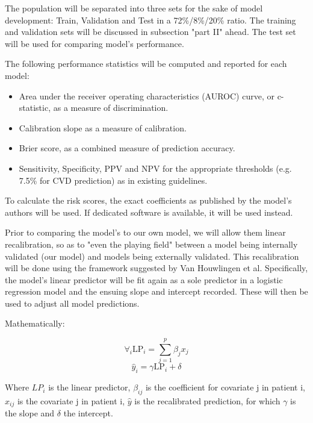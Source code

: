\documentclass[a4paper,12pt]{article}
\begin{document}
		The population will be separated into three sets for the sake of model development: Train, Validation and Test in a 72\%/8\%/20\% ratio. The training and validation sets will be discussed in subsection "part II" ahead. The test set will be used for comparing model's performance.
		
		The following performance statistics will be computed and reported for each model\cite{Steyerberg2008,FrankE.Harrell2015}:
		
		\begin{itemize}
			\item Area under the receiver operating characteristics (AUROC) curve, or c-statistic, as a measure of discrimination.
			\item Calibration slope as a measure of calibration.
			\item Brier score, as a combined measure of prediction accuracy.
			\item Sensitivity, Specificity, PPV and NPV for the appropriate thresholds (e.g. 7.5\% for CVD prediction) as in existing guidelines\cite{Goff2014,Bibbins-Domingo2016}.
		\end{itemize}
		
		To calculate the risk scores, the exact coefficients as published by the model's authors will be used. If dedicated software is available, it will be used instead.
		
		Prior to comparing the model's to our own model, we will allow them linear recalibration, so as to "even the playing field" between a model being internally validated (our model) and models being externally validated. This recalibration will be done using the framework suggested by Van Houwlingen et al\cite{Houwelingen2000}. Specifically, the model's linear predictor will be fit again as a sole predictor in a logistic regression model and the ensuing slope and intercept recorded. These will then be used to adjust all model predictions.
	
		Mathematically:
		
		\begin{equation*}
		\forall_i \text{LP}_i = \sum_{j=1}^{p}\beta_jx_j
		\end{equation*}
		\begin{equation*}
		\hat{y}_i = \gamma \text{LP}_i + \delta
		\end{equation*}
		
		Where $ LP_i $ is the linear predictor, $ \beta_{ij} $ is the coefficient for covariate j in patient i, $ x_{ij} $ is the covariate j in patient i, $ \hat{y} $ is the recalibrated prediction, for which $ \gamma $ is the slope and $ \delta $ the intercept.
		
\end{document}
